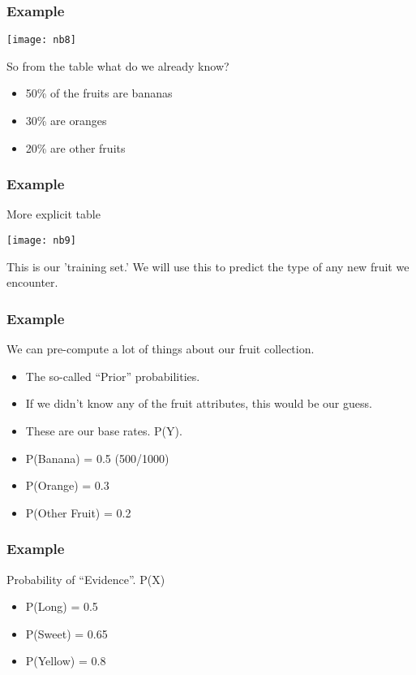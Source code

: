 \begin{frame}[fragile]\frametitle{Example}
\begin{center}
\texttt{[image: nb8]}
\end{center}
So from the table what do we already know?
\begin{itemize}
\item     50\% of the fruits are bananas
\item     30\% are oranges
\item     20\% are other fruits
\end{itemize}

\end{frame}

\begin{frame}[fragile]\frametitle{Example}
More explicit table
\begin{center}
\texttt{[image: nb9]}
\end{center}
This is our 'training set.' We will use this to predict the type of any new fruit we encounter.
\end{frame}

\begin{frame}[fragile]\frametitle{Example}
We can pre-compute a lot of things about our fruit collection.
\begin{itemize}
\item     The so-called ``Prior'' probabilities. 
\item If we didn't know any of the fruit attributes, this would be our guess.
\item These are our base rates. P(Y).
\item P(Banana)      = 0.5 (500/1000)
\item  P(Orange)      = 0.3
\item  P(Other Fruit) = 0.2
\end{itemize}
\end{frame}

\begin{frame}[fragile]\frametitle{Example}
Probability of ``Evidence''. P(X)
\begin{itemize}
\item P(Long)   = 0.5
\item P(Sweet)  = 0.65
\item P(Yellow) = 0.8
\end{itemize}
\end{frame}



